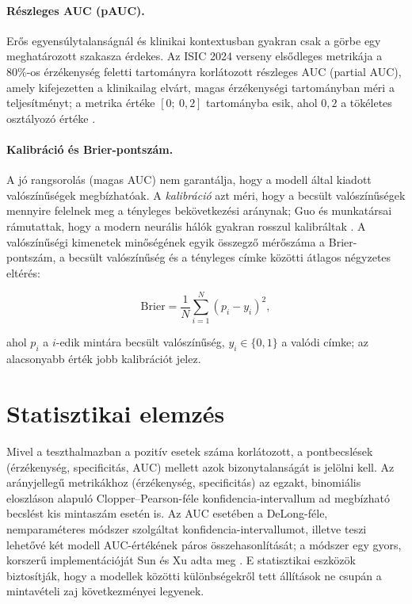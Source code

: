 \paragraph{Részleges AUC (pAUC).} Erős egyensúlytalanságnál és klinikai
kontextusban gyakran csak a görbe egy meghatározott szakasza érdekes. Az ISIC
2024 verseny elsődleges metrikája a 80\%-os érzékenység feletti tartományra
korlátozott részleges AUC (partial AUC), amely kifejezetten a klinikailag
elvárt, magas érzékenységi tartományban méri a teljesítményt; a metrika
értéke $[0;\ 0{,}2]$ tartományba esik, ahol $0{,}2$ a tökéletes osztályozó
értéke \cite{isic2024}.

\paragraph{Kalibráció és Brier-pontszám.} A jó rangsorolás (magas AUC) nem
garantálja, hogy a modell által kiadott valószínűségek megbízhatóak. A
\textit{kalibráció} azt méri, hogy a becsült valószínűségek mennyire felelnek
meg a tényleges bekövetkezési aránynak; Guo és munkatársai rámutattak, hogy a
modern neurális hálók gyakran rosszul kalibráltak \cite{guo2017calibration}. A
valószínűségi kimenetek minőségének egyik összegző mérőszáma a Brier-pontszám, a becsült valószínűség és a
tényleges címke közötti átlagos négyzetes eltérés:

\begin{equation}
  \mathrm{Brier} = \frac{1}{N} \sum_{i=1}^{N} (p_i - y_i)^2,
  \label{eq:brier}
\end{equation}

ahol $p_i$ a $i$-edik mintára becsült valószínűség, $y_i \in \{0,1\}$ a valódi
címke; az alacsonyabb érték jobb kalibrációt jelez.

\section{Statisztikai elemzés}

Mivel a teszthalmazban a pozitív esetek száma korlátozott, a pontbecslések
(érzékenység, specificitás, AUC) mellett azok bizonytalanságát is jelölni kell.
Az arányjellegű metrikákhoz (érzékenység, specificitás) az egzakt, binomiális
eloszláson alapuló Clopper--Pearson-féle konfidencia-intervallum ad megbízható
becslést kis mintaszám esetén is. Az AUC esetében a DeLong-féle, nemparaméteres
módszer szolgáltat konfidencia-intervallumot, illetve teszi lehetővé két modell
AUC-értékének páros összehasonlítását; a módszer egy gyors, korszerű
implementációját Sun és Xu adta meg \cite{sun2014delong}. E statisztikai eszközök
biztosítják, hogy a modellek közötti különbségekről tett állítások ne csupán a
mintavételi zaj következményei legyenek.

